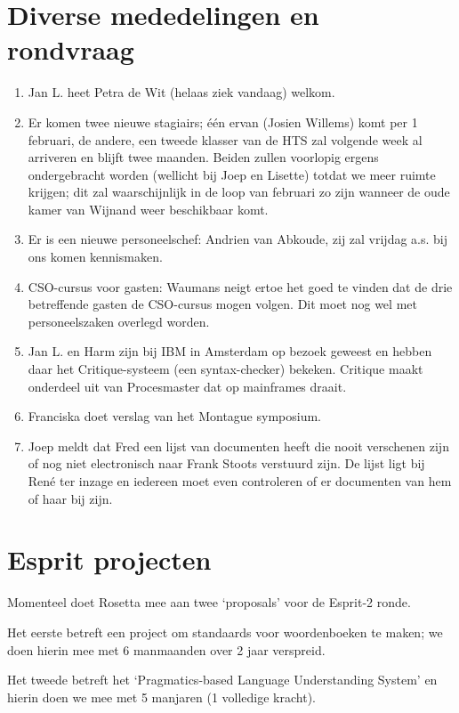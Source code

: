 \begin{itemize}
\section {Diverse mededelingen en rondvraag}
\begin{enumerate}
   \item Jan L. heet Petra de Wit (helaas ziek vandaag) welkom.
   \item Er komen twee nieuwe stagiairs; \'{e}\'{e}n ervan (Josien Willems) komt
         per 1 februari, de andere, een tweede klasser van de HTS zal volgende
         week al arriveren en blijft twee maanden.
         Beiden zullen voorlopig ergens ondergebracht worden (wellicht bij Joep
         en Lisette) totdat we meer ruimte krijgen; dit zal waarschijnlijk in
         de loop van februari zo zijn wanneer de oude kamer van Wijnand weer
         beschikbaar komt.
   \item Er is een nieuwe personeelschef: Andrien van Abkoude, zij zal vrijdag
         a.s. bij ons komen kennismaken.
   \item CSO-cursus voor gasten: Waumans neigt ertoe het goed te vinden dat de 
         drie betreffende gasten de CSO-cursus mogen volgen. Dit moet nog wel
         met personeelszaken overlegd worden.
   \item Jan L. en Harm zijn bij IBM in Amsterdam op bezoek geweest en hebben 
         daar het Critique-systeem (een syntax-checker) bekeken. Critique
         maakt onderdeel uit van Procesmaster dat op mainframes draait.
   \item Franciska doet verslag van het Montague symposium.
   \item Joep meldt dat Fred een lijst van documenten heeft die nooit verschenen
         zijn of nog niet electronisch naar Frank Stoots verstuurd zijn. De 
         lijst ligt bij Ren\'{e} ter inzage en iedereen moet even controleren of
         er documenten van hem of haar bij zijn.
\end{enumerate}

\section {Esprit projecten}

Momenteel doet Rosetta mee aan twee `proposals' voor de Esprit-2 ronde. 

Het eerste betreft een project om standaards voor woordenboeken te maken; we 
doen hierin mee met 6 manmaanden over 2 jaar verspreid.

Het tweede betreft het `Pragmatics-based Language Understanding System' en hierin
doen we mee met 5 manjaren (1 volledige kracht).


\end{itemize}
